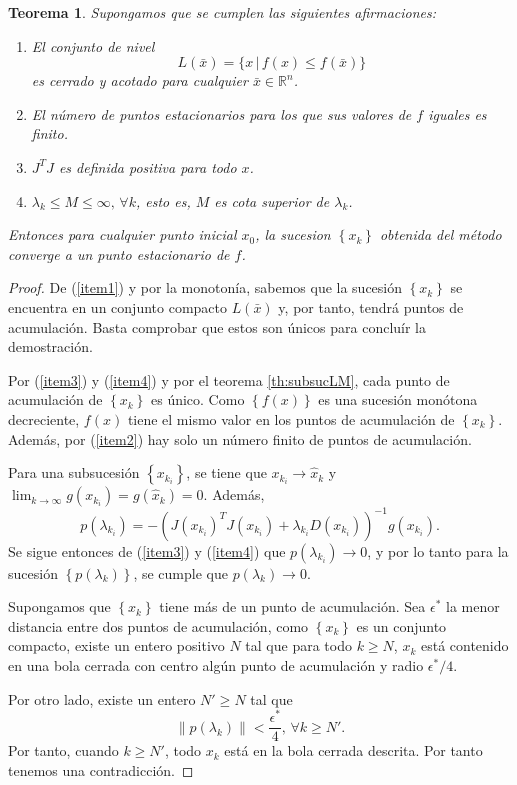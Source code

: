 \documentclass[11pt,a4paper]{book}
\newtheorem{theorem}{Teorema}[chapter]
\theoremstyle{definition}
\theoremstyle{remark}
\newcommand{\norm}[1]{\left\lVert#1\right\rVert}
\newcommand{\sucesionxk}{\left\{x_k\right\}}
\newcommand{\sucesion}[1]{\left\{#1\right\}}
\begin{document}
\begin{theorem}
	Supongamos que se cumplen las siguientes afirmaciones:
	\begin{enumerate}
		\item\label{item1}
		El conjunto de nivel
		\begin{equation*}
			L(\bar x) = \{x\,|\,f(x)\leq f(\bar x)\}
		\end{equation*}
		es cerrado y acotado para cualquier $\bar x \in \mathbb{R}^n$.
		\item\label{item2}
		El número de puntos estacionarios para los que sus valores de $f$
		iguales es finito.
		\item\label{item3}
		$J^TJ$ es definida positiva para todo $x$.
		\item\label{item4}
		$\lambda_k \leq M \leq \infty, \, \forall k$, esto es,
		$M$ es cota superior de $\lambda_k$.
	\end{enumerate}
	Entonces para cualquier punto inicial $x_0$, la sucesion $\sucesionxk$ obtenida del método converge a un punto estacionario de $f$.
\end{theorem}
\begin{proof}
De (\ref{item1}) y por la monotonía, sabemos que la sucesión $\sucesionxk$ se encuentra en un conjunto compacto $L(\bar x)$ y, por tanto, tendrá puntos de acumulación. Basta comprobar que estos son únicos para concluír la demostración.

Por (\ref{item3}) y (\ref{item4}) y por el teorema \ref{th:subsucLM}, cada punto de acumulación de $\sucesionxk$ es único. Como $\sucesion{f(x)}$ es una sucesión monótona decreciente, $f(x)$ tiene el mismo valor en los puntos de acumulación de $\sucesionxk$. Además, por (\ref{item2}) hay solo un número finito de puntos de acumulación.

Para una subsucesión $\sucesion{x_{k_i}}$, se tiene que $x_{k_i} \rightarrow \hat x_k$ y $\lim_{k\rightarrow\infty}g(x_{k_i})=g(\hat x_k)=0$. Además,
\begin{equation}
	p(\lambda_{k_i})=
	-(J(x_{k_i})^TJ(x_{k_i}) + \lambda_{k_i}D(x_{k_i}))^{-1}g(x_{k_i}).
\end{equation}
Se sigue entonces de (\ref{item3}) y (\ref{item4}) que $p(\lambda_{k_i})\rightarrow 0$, y por lo tanto para la sucesión $\sucesion{p(\lambda_k)}$, se cumple que $p(\lambda_k)\rightarrow 0$.

Supongamos que $\sucesionxk$ tiene más de un punto de acumulación. Sea $\epsilon^*$ la menor distancia entre dos puntos de acumulación, como $\sucesionxk$ es un conjunto compacto, existe un entero positivo $N$ tal que para todo $k \geq N$, $x_k$ está contenido en una bola cerrada con centro algún punto de acumulación y radio $\epsilon^*/4$.

Por otro lado, existe un entero $N'\geq N$ tal que
\begin{equation}
	\norm{p(\lambda_k)}<\frac{\epsilon^*}{4},\,\forall k\geq N'.
\end{equation}
Por tanto, cuando $k\geq N'$, todo $x_k$ está en la bola cerrada descrita. Por tanto tenemos una contradicción.
\end{proof}
\end{document}
